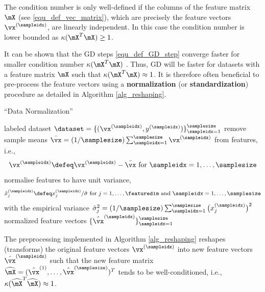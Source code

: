 \documentclass[12pt]{report}
\begin{document}
The condition number is only well-defined if the columns of the feature matrix $\mX$ 
(see \eqref{equ_def_vec_matrix}), which are precisely the feature vectors $\vx^{(\sampleidx)}$, 
are linearly independent. In this case the condition number is lower bounded 
as $\kappa( \mX^{T} \mX) \geq 1$. 

It can be shown that the GD steps \eqref{equ_def_GD_step} converge faster for 
smaller condition number $\kappa( \mX^{T} \mX)$ \cite{JungFixedPoint}. Thus, GD 
will be faster for datasets with a feature matrix $\mX$ such that  $\kappa( \mX^{T} \mX) \approx 1$. 
It is therefore often beneficial to pre-process the feature vectors using a {\bf normalization} 
(or {\bf standardization}) procedure as detailed in Algorithm \ref{alg_reshaping}. 
 
 \begin{algorithm}[htbp]
\caption{``Data Normalization''}\label{alg_reshaping}
\begin{algorithmic}[1]
\renewcommand{\algorithmicrequire}{\textbf{Input:}}
\renewcommand{\algorithmicensure}{\textbf{Output:}}
\Require   labeled dataset $\dataset = \{(\vx^{(\sampleidx)},y^{(\sampleidx)})\}_{\sampleidx=1}^{\samplesize}$
\vspace*{2mm}
\State remove sample means $\bar{\vx}=(1/\samplesize) \sum_{\sampleidx=1}^{\samplesize}  \vx^{(\sampleidx)}$ from features, i.e., 
 \begin{equation}
 \nonumber
 \vx^{(\sampleidx)} \defeq \vx^{(\sampleidx)} - \bar{\vx} \mbox{ for  }  \sampleidx=1,\ldots,\samplesize
 \end{equation} 
\State normalise features to have unit variance,  
 \begin{equation} 
 \nonumber
 \hat{x}^{(\sampleidx)}_{j} \defeq x^{(\sampleidx)}_{j}/ \hat{\sigma}   \mbox{ for  } j=1,\ldots,\featuredim \mbox{ and } \sampleidx=1,\ldots,\samplesize
 \end{equation}
 with the empirical variance $\hat{\sigma}_{j}^{2}  =(1/\samplesize) \sum_{\sampleidx=1}^{\samplesize} \big( x^{(\sampleidx)}_{j} \big)^{2}$ 
\Ensure normalized feature vectors $\{\hat{\vx}^{(\sampleidx)}\}_{\sampleidx=1}^{\samplesize}$
\end{algorithmic}
\end{algorithm}
The preprocessing implemented in Algorithm \ref{alg_reshaping} reshapes (transforms) the 
original feature vectors $\vx^{(\sampleidx)}$ into new feature vectors $\hat{\vx}^{(\sampleidx)}$ 
such that the new feature matrix $\widehat{\mX} = (\hat{\vx}^{(1)},\ldots,\hat{\vx}^{(\samplesize)})^{T}$ 
tends to be well-conditioned, i.e., $\kappa( \widehat{\mX}^{T} \widehat{\mX}) \approx 1$. 
\end{document}
